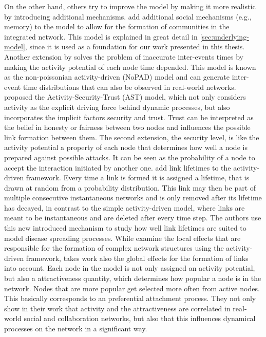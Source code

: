 On the other hand, others try to improve the model by making it more realistic by introducing additional mechanisms.
\citet{Laurent2015} add additional social mechanisms (e.g., memory) to the model to allow for the formation of communities in the integrated network.
This model is explained in great detail in \cref{sec:underlying-model}, since it is used as a foundation for our work presented in this thesis.
Another extension by \citet{Moinet2015, Moinet2016} solves the problem of inaccurate inter-events times by making the activity potential of each node time depended.
This model is known as the non-poissonian activity-driven (NoPAD) model and can generate inter-event time distributions that can also be observed in real-world networks.
\citet{Wang2016} proposed the Activity-Security-Trust (AST) model, which not only considers activity as the explicit driving force behind dynamic processes, but also incorporates the implicit factors security and trust.
Trust can be interpreted as the belief in honesty or fairness between two nodes and influences the possible link formation between them.
The second extension, the security level, is like the activity potential a property of each node that determines how well a node is prepared against possible attacks.
It can be seen as the probability of a node to accept the interaction initiated by another one.
\citet{Sunny2015} add link lifetimes to the activity-driven framework.
Every time a link is formed it is assigned a lifetime, that is drawn at random from a probability distribution.
This link may then be part of multiple consecutive instantaneous networks
and is only removed after its lifetime has decayed, in contrast to the simple activity-driven model, where links are meant to be instantaneous and are deleted after every time step.
The authors use this new introduced mechanism to study how well link lifetimes are suited to model disease spreading processes.
While \citet{Laurent2015} examine the local effects that are responsible for the formation of complex network structures using the activity-driven framework, takes \citet{Alessandretti2017} work also the global effects for the formation of links into account.
Each node in the model is not only assigned an activity potential, but also a attractiveness quantity, which determines how popular a node is in the network.
Nodes that are more popular get selected more often from active nodes.
This basically corresponds to an preferential attachment process.
They not only show in their work that activity and the attractiveness are correlated in real-world social and collaboration networks, but also that this influences dynamical processes on the network in a significant way.


